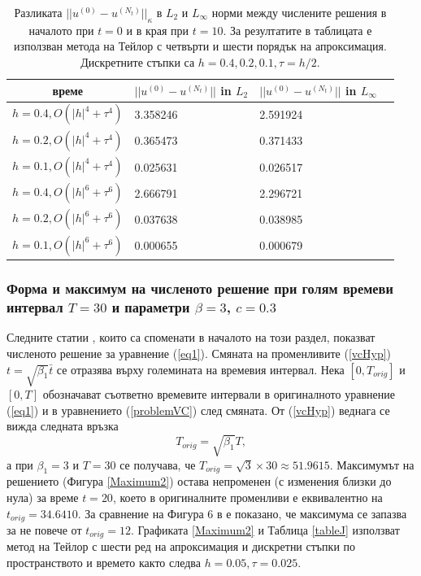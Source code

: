 \documentclass{article}
\newcommand{\rf}[1]{(\ref{#1})}
\theoremstyle{remark}
\begin{document}
\begin{table}[ht]
\centering
\small
		\begin{tabular}{||c|l|l|l||}
			\hline
			\hline
  време   &  $||u^{(0)} - u^{(N_t)}||$ in $L_2$  & $||u^{(0)} - u^{(N_t)}||$ in $L_\infty$   \\
   		      \hline 
			\hline
  $h=0.4, O(|h|^4+\tau^4)$   & 3.358246 & 2.591924      \\
			\hline 
  $h=0.2, O(|h|^4+\tau^4)$   & 0.365473 & 0.371433      \\
			\hline 
  $h=0.1, O(|h|^4+\tau^4)$   & 0.025631 & 0.026517      \\
	   \hline
  $h=0.4, O(|h|^6+\tau^6)$   & 2.666791 & 2.296721      \\
			\hline
  $h=0.2, O(|h|^6+\tau^6)$   & 0.037638 & 0.038985      \\
    \hline
  $h=0.1, O(|h|^6+\tau^6)$   & 0.000655 & 0.000679       \\
	   \hline
		\hline 
		\end{tabular}
		\caption{Разликата $||u^{(0)} - u^{(N_t)}||_\kappa$ в $L_2$ и $L_\infty$ норми между числените решения в началото при $t=0$ и в края при $t=10$. За резултатите в таблицата е използван метода на Тейлор с четвърти и шести порядък на апроксимация. Дискретните стъпки са $h=0.4, 0.2, 0.1, \tau = h/2$. }
\label{tableK}
\end{table}
\FloatBarrier

\subsubsection{Форма и максимум на численото решение при голям времеви интервал $T=30$ и параметри $\beta = 3$, $c=0.3$}
Следните статии \cite{ref21, dani, milenaDani, ref22}, които са споменати в началото на този раздел, показват численото решение за уравнение \rf{eq1}. Смяната на променливите \rf{vcHyp} $t = \sqrt{\beta_1} \bar{t}$ се отразява върху големината на времевия интервал. Нека $[0, T_{orig}]$ и $[0, T]$ обозначават съответно времевите интервали в оригиналното уравнение \rf{eq1} и в уравнението \rf{problemVC} след смяната. От \rf{vcHyp} веднага се вижда следната връзка
$$
T_{orig} = \sqrt{\beta_1} T,
$$
а при $\beta_1 = 3$ и $T=30$ се получава, че $T_{orig} = \sqrt{3} \times 30 \approx 51.9615$. Максимумът на решението (Фигура \ref{Maximum2}) остава непроменен (с изменения близки до нула) за време $t=20$, което в оригиналните променливи е еквивалентно на $t_{orig}=34.6410$. За сравнение на Фигура 6 в \cite{ref21} е показано, че максимума се запазва за не повече от $t_{orig}=12$. Графиката \ref{Maximum2} и Таблица \ref{tableJ} използват метод на Тейлор с шести ред на апроксимация и дискретни стъпки по пространството и времето както следва $h=0.05, \tau = 0.025$.
\end{document}
